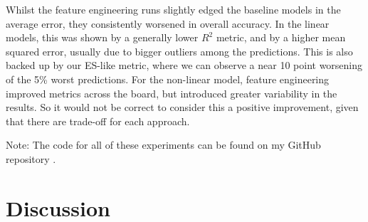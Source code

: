 \documentclass[12pt]{report} %
\begin{document}
Whilst the feature engineering runs slightly edged the baseline models in the average error, they consistently worsened in overall accuracy. In the linear models, this was shown by a generally lower $R^2$ metric, and by a higher mean squared error, usually due to bigger outliers among the predictions. This is also backed up by our ES-like metric, where we can observe a near 10 point worsening of the 5\% worst predictions. For the non-linear model, feature engineering improved metrics across the board, but introduced greater variability in the results. So it would not be correct to consider this a positive improvement, given that there are trade-off for each approach.

Note: The code for all of these experiments can be found on my GitHub repository \cite{rodrigodelamaTFG}.


\section{Discussion} %







\end{document}
